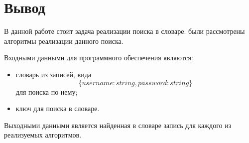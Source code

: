 \section{Вывод}

В данной работе стоит задача реализации поиска в словаре. были рассмотрены алгоритмы реализации данного поиска.

Входными данными для программного обеспечения являются:
\begin{itemize}
    \item словарь из записей, вида \[\{username: string, password: string\}\] для поиска по нему;
    \item ключ для поиска в словаре.
\end{itemize}

Выходными данными является найденная в словаре запись для каждого из реализуемых алгоритмов.

